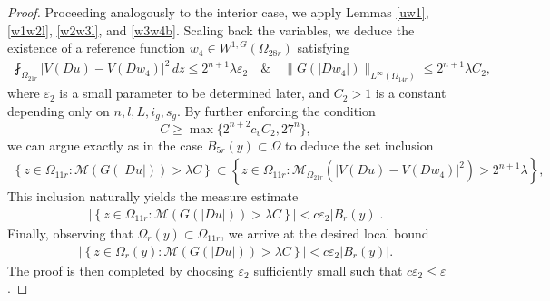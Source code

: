 \documentclass[10pt,a4paper]{article}
\theoremstyle{definition}
\numberwithin{equation}{section}
\begin{document}
\begin{proof}
 	Proceeding analogously to the interior case, we apply Lemmas \ref{uw1}, \ref{w1w2l}, \ref{w2w3l}, and \ref{w3w4b}. Scaling back the variables, we deduce the existence of a reference function $w_4 \in W^{1,G}(\Omega_{28r})$ satisfying
 	\begin{align*}
 		\fint_{\Omega_{21r}}
 		|V(Du)-V(Dw_4)|^2\,dz
 		 \leq 2^{n+1}\lambda \varepsilon_2 \quad \& \quad  \|G(|Dw_4|)\|_{L^\infty(\Omega_{14r})}
 		 \leq
 		2^{n+1}\lambda C_2 ,
 	\end{align*}
 where $\varepsilon_2$ is a small parameter to be determined later, and $C_2 > 1$ is a constant depending only on $n, l, L, i_g, s_g$.
 By further enforcing the condition
 	\[
 C\geq \max\{2^{n+2}c_vC_2,27^n\},
 	\]
 	we can argue exactly as in the case $B_{5r}(y) \subset \Omega$ to deduce the set inclusion
 	\begin{align*}
 		\left\{
 		z\in\Omega_{11r}:
 		\mathcal{M}(G(|Du|))>\lambda C
 		\right\}
 		\subset
 		\left\{
 		z\in\Omega_{11r}:
 		\mathcal{M}_{\Omega_{21r}}
 		\left(
 		|V(Du)-V(Dw_4)|^2
 		\right)
 		>2^{n+1}\lambda
 		\right\},
 	\end{align*}
This inclusion naturally yields the measure estimate
 	\begin{align*}
 		\left|
 		\left\{
 		z\in\Omega_{11r}:
 		\mathcal{M}(G(|Du|))>\lambda C
 		\right\}
 		\right|
 		<
 		c\varepsilon_2|B_r(y)|.
 	\end{align*}
 	Finally, observing that $\Omega_r(y) \subset \Omega_{11r}$, we arrive at the desired local bound
 	\begin{align*}
 		\left|
 		\left\{
 		z\in\Omega_r(y):
 		\mathcal{M}(G(|Du|))>\lambda C
 		\right\}
 		\right|
 		<
 		c\varepsilon_2|B_r(y)|.
 	\end{align*}
 The proof is then completed by choosing $\varepsilon_2$ sufficiently small such that $c\varepsilon_2 \leq \varepsilon$.
 \end{proof}
 
\end{document}
